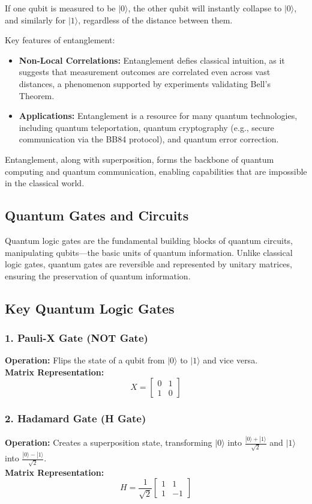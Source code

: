 \documentclass[11pt]{article}
\theoremstyle{definition}
\begin{document}
If one qubit is measured to be $|0\rangle$, the other qubit will instantly collapse to $|0\rangle$, and similarly for $|1\rangle$, regardless of the distance between them.

Key features of entanglement:
\begin{itemize}
    \item \textbf{Non-Local Correlations:} Entanglement defies classical intuition, as it suggests that measurement outcomes are correlated even across vast distances, a phenomenon supported by experiments validating Bell's Theorem.
    \item \textbf{Applications:} Entanglement is a resource for many quantum technologies, including quantum teleportation, quantum cryptography (e.g., secure communication via the BB84 protocol), and quantum error correction.
\end{itemize}

Entanglement, along with superposition, forms the backbone of quantum computing and quantum communication, enabling capabilities that are impossible in the classical world.




\subsection*{Quantum Gates and Circuits}


Quantum logic gates are the fundamental building blocks of quantum circuits, manipulating qubits—the basic units of quantum information. Unlike classical logic gates, quantum gates are reversible and represented by unitary matrices, ensuring the preservation of quantum information.

\subsection*{Key Quantum Logic Gates}

\subsubsection*{1. Pauli-X Gate (NOT Gate)}
\textbf{Operation:} Flips the state of a qubit from $|0\rangle$ to $|1\rangle$ and vice versa. \\
\textbf{Matrix Representation:}
\[
X = 
\begin{bmatrix}
0 & 1 \\
1 & 0
\end{bmatrix}
\]

\subsubsection*{2. Hadamard Gate (H Gate)}
\textbf{Operation:} Creates a superposition state, transforming $|0\rangle$ into $\frac{|0\rangle + |1\rangle}{\sqrt{2}}$ and $|1\rangle$ into $\frac{|0\rangle - |1\rangle}{\sqrt{2}}$. \\
\textbf{Matrix Representation:}
\[
H = \frac{1}{\sqrt{2}}
\begin{bmatrix}
1 & 1 \\
1 & -1
\end{bmatrix}
\]
\end{document}
